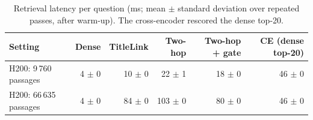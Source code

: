 \begin{table}[t]
\centering
\footnotesize
\caption{Retrieval latency per question (ms; mean $\pm$ standard deviation over repeated passes, after warm-up). The cross-encoder rescored the dense top-20.}
\label{tab:timing}
\begin{tabular}{lrrrrr}
\toprule
Setting & Dense & TitleLink & Two-hop & Two-hop + gate & CE (dense top-20) \\
\midrule
H200: 9\,760 passages & 4 $\pm$ 0 & 10 $\pm$ 0 & 22 $\pm$ 1 & 18 $\pm$ 0 & 46 $\pm$ 0 \\
H200: 66\,635 passages & 4 $\pm$ 0 & 84 $\pm$ 0 & 103 $\pm$ 0 & 80 $\pm$ 0 & 46 $\pm$ 0 \\
\bottomrule
\end{tabular}
\end{table}
